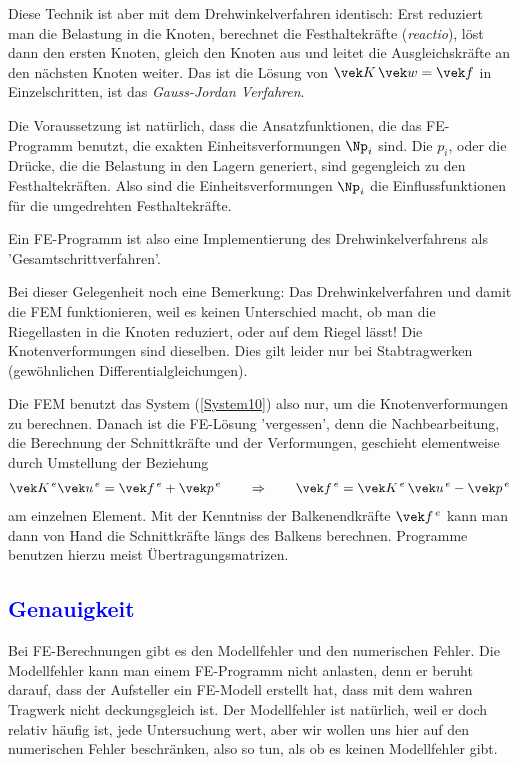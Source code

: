 {{Diese Technik ist aber mit dem Drehwinkelverfahren identisch: Erst reduziert man die Belastung in die Knoten, berechnet die Festhaltekr\"{a}fte ({\em reactio\/}), l\"{o}st dann den ersten Knoten, gleich den Knoten aus  und leitet die Ausgleichskr\"{a}fte an den n\"{a}chsten Knoten weiter. Das ist die L\"{o}sung von $\vek K\,\vek w = \vek f$ in Einzelschritten, ist das {\em Gauss-Jordan Verfahren\/}.

Die Voraussetzung ist nat\"{u}rlich, dass die Ansatzfunktionen, die das FE-Programm
benutzt, die exakten Einheitsverformungen $\Np_i$ sind. Die $p_i$, oder die Dr\"{u}cke, die die Belastung in den Lagern generiert, sind gegengleich zu den Festhaltekr\"{a}ften. Also sind die Einheitsverformungen $\Np_i$ die Einflussfunktionen f\"{u}r die umgedrehten Festhaltekr\"{a}fte.

Ein FE-Programm ist also eine
Implementierung des Drehwinkelverfahrens als 'Gesamtschrittverfahren'.

Bei dieser Gelegenheit noch eine Bemerkung: Das Drehwinkelverfahren und damit die FEM funktionieren, weil es keinen Unterschied macht, ob man die Riegellasten in die Knoten reduziert, oder auf dem Riegel l\"{a}sst! Die Knotenverformungen sind dieselben. Dies gilt leider nur bei Stabtragwerken (gew\"{o}hnlichen Differentialgleichungen).

Die FEM benutzt das System (\ref{System10}) also nur, um die Knotenverformungen zu berechnen. Danach ist die FE-L\"{o}sung 'vergessen', denn die Nachbearbeitung, die Berechnung
der Schnittkr\"{a}fte und der Verformungen, geschieht elementweise durch Umstellung der
Beziehung
\begin{align}\label{ElementGlg}
\vek K^{\,e} \vek u^{\,e} =\vek f^{\,e} + \vek p^{\,e} \qquad \Rightarrow \qquad \vek
f^{\,e} = \vek K^{\,e}\,\vek u^{\,e} - \vek p^{\,e}
\end{align}
am einzelnen Element. Mit der Kenntniss der Balkenendkr\"{a}fte $\vek f^{\,e}$ kann man dann von Hand die
Schnittkr\"{a}fte l\"{a}ngs des Balkens berechnen. Programme benutzen hierzu meist
\"{U}bertragungsmatrizen.



{\textcolor{blue}{\section{Genauigkeit}}}\label{Genauigkeit}
Bei FE-Berechnungen gibt es den Modellfehler und den numerischen Fehler. Die Modellfehler kann man einem
FE-Programm nicht anlasten, denn er beruht darauf, dass der Aufsteller ein FE-Modell erstellt hat,
dass mit dem wahren Tragwerk nicht deckungsgleich ist. Der Modellfehler ist nat\"{u}rlich, weil er doch
relativ h\"{a}ufig ist, jede Untersuchung wert, aber wir wollen uns hier auf den numerischen Fehler beschr\"{a}nken, also
so tun, als ob es keinen Modellfehler gibt.

}}
